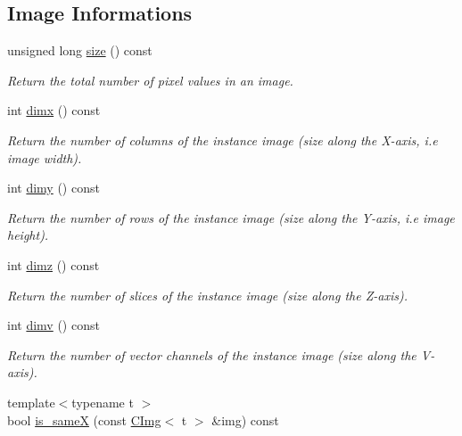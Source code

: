 \subsection*{Image Informations}
\begin{DoxyCompactItemize}
\item 
unsigned long \hyperlink{structcimg__library_1_1_c_img_a4f22f4188289724c853ed6a12b0a2e1e}{size} () const 
\begin{DoxyCompactList}\small\item\em Return the total number of pixel values in an image. \end{DoxyCompactList}\item 
int \hyperlink{structcimg__library_1_1_c_img_abf1a3c383880a20428b2ea9d22f3c06e}{dimx} () const 
\begin{DoxyCompactList}\small\item\em Return the number of columns of the instance image (size along the X-\/axis, i.\-e image width). \end{DoxyCompactList}\item 
int \hyperlink{structcimg__library_1_1_c_img_aa1e128f9d950b39ed312eb368741970c}{dimy} () const 
\begin{DoxyCompactList}\small\item\em Return the number of rows of the instance image (size along the Y-\/axis, i.\-e image height). \end{DoxyCompactList}\item 
int \hyperlink{structcimg__library_1_1_c_img_aba56e96a615d71ed9a71009768fc4b75}{dimz} () const 
\begin{DoxyCompactList}\small\item\em Return the number of slices of the instance image (size along the Z-\/axis). \end{DoxyCompactList}\item 
int \hyperlink{structcimg__library_1_1_c_img_ad30f8300f32a94a80e1e06c84a45de49}{dimv} () const 
\begin{DoxyCompactList}\small\item\em Return the number of vector channels of the instance image (size along the V-\/axis). \end{DoxyCompactList}\item 
\hypertarget{structcimg__library_1_1_c_img_a5ca62e8642d0f7d95d4ac435f8f18721}{{\footnotesize template$<$typename t $>$ }\\bool \hyperlink{structcimg__library_1_1_c_img_a5ca62e8642d0f7d95d4ac435f8f18721}{is\-\_\-same\-X} (const \hyperlink{structcimg__library_1_1_c_img}{C\-Img}$<$ t $>$ \&img) const }\label{structcimg__library_1_1_c_img_a5ca62e8642d0f7d95d4ac435f8f18721}


\end{DoxyCompactItemize}
